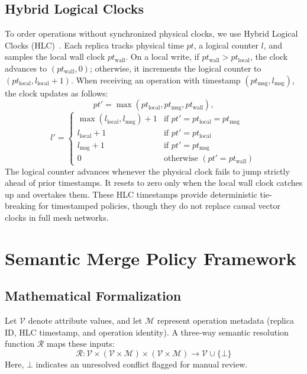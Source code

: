 \documentclass[conference]{IEEEtran}
\begin{document}
\subsection{Hybrid Logical Clocks}
To order operations without synchronized physical clocks, we use Hybrid Logical Clocks (HLC)~\cite{hlc2014}. Each replica tracks physical time $pt$, a logical counter $l$, and samples the local wall clock $pt_{\text{wall}}$. On a local write, if $pt_{\text{wall}} > pt_{\text{local}}$, the clock advances to $(pt_{\text{wall}}, 0)$; otherwise, it increments the logical counter to $(pt_{\text{local}}, l_{\text{local}} + 1)$. When receiving an operation with timestamp $(pt_{\text{msg}}, l_{\text{msg}})$, the clock updates as follows:
\begin{equation}
pt' = \max(pt_{\text{local}}, pt_{\text{msg}}, pt_{\text{wall}}),
\end{equation}
\begin{equation}
l' = \begin{cases} 
\max(l_{\text{local}}, l_{\text{msg}}) + 1 & \text{if } pt' = pt_{\text{local}} = pt_{\text{msg}} \\ 
l_{\text{local}} + 1 & \text{if } pt' = pt_{\text{local}} \\ 
l_{\text{msg}} + 1 & \text{if } pt' = pt_{\text{msg}} \\ 
0 & \text{otherwise } (pt' = pt_{\text{wall}}) 
\end{cases}
\end{equation}
The logical counter advances whenever the physical clock fails to jump strictly ahead of prior timestamps. It resets to zero only when the local wall clock catches up and overtakes them. These HLC timestamps provide deterministic tie-breaking for timestamped policies, though they do not replace causal vector clocks in full mesh networks.

\section{Semantic Merge Policy Framework}

\subsection{Mathematical Formalization}
Let $\mathcal{V}$ denote attribute values, and let $\mathcal{M}$ represent operation metadata (replica ID, HLC timestamp, and operation identity). A three-way semantic resolution function $\mathcal{R}$ maps these inputs:
\begin{equation}
\mathcal{R}: \mathcal{V} \times (\mathcal{V} \times \mathcal{M}) \times (\mathcal{V} \times \mathcal{M}) \to \mathcal{V} \cup \{\bot\}
\end{equation}
Here, $\bot$ indicates an unresolved conflict flagged for manual review.
\end{document}
